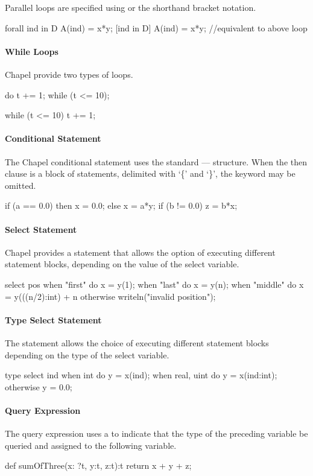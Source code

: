 Parallel loops are specified using  or
the shorthand bracket notation.
\begin{chapel}
forall ind in D {
  A(ind) = x*y;
}
[ind in D] A(ind) = x*y; //equivalent to above loop
\end{chapel}
\paragraph{While Loops}
Chapel provide two types of  loops.
\begin{chapel}
do {
  t += 1;
} while (t <= 10);

while (t <= 10) {
  t += 1;
}
\end{chapel}
\paragraph{Conditional Statement}
The Chapel conditional statement uses the standard 
---- structure.  When
the then clause is a block of statements, delimited with
`\{' and `\}', the  keyword may be omitted.
\begin{chapel}
if (a == 0.0) then x = 0.0;
else x = a*y;
if (b != 0.0) {
  z = b*x;
}
\end{chapel}
\paragraph{Select Statement}
Chapel provides a  statement that allows the option of
executing different statement blocks, depending on the value of the
select variable.
\begin{chapel}
select pos {
  when "first" do x = y(1);
  when "last" do x = y(n);
  when "middle" do x = y(((n/2):int) + n%
  otherwise writeln("invalid position");
}
\end{chapel}
\paragraph{Type Select Statement}
The  statement allows the choice of
executing different statement blocks depending on the type
of the select variable.
\begin{chapel}
type select ind {
  when int do y = x(ind);
  when real, uint do y = x(ind:int);
  otherwise y = 0.0;
}
\end{chapel}
\paragraph{Query Expression}
The query expression uses a  to indicate that the type of the
preceding variable be queried and assigned to the following variable.
\begin{chapel}
def sumOfThree(x: ?t, y:t, z:t):t {
   return x + y + z;
}
\end{chapel}
